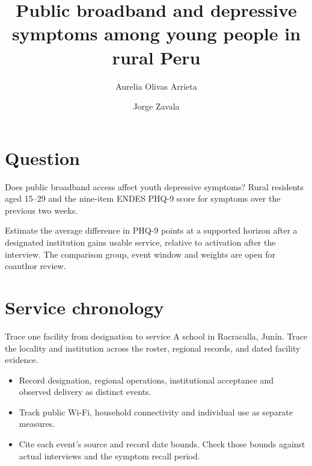 \usepackage[authoryear,round]{natbib}
\usepackage{booktabs}

\title[Public broadband and youth mental health]{Public broadband and depressive symptoms among young people in rural Peru}
\author{Aurelia Olivas Arrieta \and Jorge Zavala}
\date{}


\ZavalaTitle

\section{Question}
\begin{frame}{Does public broadband access affect youth depressive symptoms?}
  Rural residents aged 15--29 and the nine-item ENDES PHQ-9 score for symptoms over the previous two weeks.

  \medskip
  Estimate the average difference in PHQ-9 points at a supported horizon after
  a designated institution gains usable service, relative to activation after the interview.
  The comparison group, event window and weights are open for coauthor review.
\end{frame}

\section{Service chronology}
\begin{frame}{Trace one facility from designation to service}
  A school in Racracalla, Junín. Trace the locality and institution across the roster, regional records, and dated facility evidence.

  \medskip
  \begin{itemize}
    \item Record designation, regional operations, institutional acceptance and observed delivery as distinct events.
    \item Track public Wi-Fi, household connectivity and individual use as separate measures.
    \item Cite each event's source and record date bounds. Check those bounds against actual interviews and the symptom recall period.
  \end{itemize}
\end{frame}

